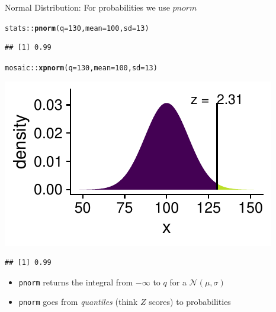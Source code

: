 \documentclass[10pt]{beamer}\usepackage[]{graphicx}\usepackage[]{color}
\makeatletter
\newcommand{\hlnum}[1]{\textcolor[rgb]{0.686,0.059,0.569}{#1}}%
\newcommand{\hlopt}[1]{\textcolor[rgb]{0,0,0}{#1}}%
\newcommand{\hlstd}[1]{\textcolor[rgb]{0.345,0.345,0.345}{#1}}%
\newcommand{\hlkwc}[1]{\textcolor[rgb]{0.333,0.667,0.333}{#1}}%
\newcommand{\hlkwd}[1]{\textcolor[rgb]{0.737,0.353,0.396}{\textbf{#1}}}%
\newenvironment{kframe}{%
 \def\at@end@of@kframe{}%
 \ifinner\ifhmode%
  \def\at@end@of@kframe{\end{minipage}}%
  \begin{minipage}{\columnwidth}%
 \fi\fi%
 \def\FrameCommand##1{\hskip\@totalleftmargin \hskip-\fboxsep
 \colorbox{shadecolor}{##1}\hskip-\fboxsep
     \hskip-\linewidth \hskip-\@totalleftmargin \hskip\columnwidth}%
 \MakeFramed {\advance\hsize-\width
   \@totalleftmargin\z@ \linewidth\hsize
   \@setminipage}}%
 {\par\unskip\endMakeFramed%
 \at@end@of@kframe}
\newenvironment{knitrout}{}{} %
\makeatother
\begin{document}
\begin{frame}[fragile]{Normal Distribution: For probabilities we use $pnorm$}
	
	
\begin{knitrout}\tiny
{}\color{fgcolor}\begin{kframe}
\begin{alltt}
\hlstd{stats}\hlopt{::}\hlkwd{pnorm}\hlstd{(}\hlkwc{q} \hlstd{=} \hlnum{130}\hlstd{,} \hlkwc{mean} \hlstd{=} \hlnum{100}\hlstd{,} \hlkwc{sd} \hlstd{=} \hlnum{13}\hlstd{)}
\end{alltt}
\begin{verbatim}
## [1] 0.99
\end{verbatim}
\end{kframe}
\end{knitrout}
	
	
\begin{knitrout}\tiny
{}\color{fgcolor}\begin{kframe}
\begin{alltt}
\hlstd{mosaic}\hlopt{::}\hlkwd{xpnorm}\hlstd{(}\hlkwc{q} \hlstd{=} \hlnum{130}\hlstd{,} \hlkwc{mean} \hlstd{=} \hlnum{100}\hlstd{,} \hlkwc{sd} \hlstd{=} \hlnum{13}\hlstd{)}
\end{alltt}
\end{kframe}

{\centering \includegraphics[width=0.6\linewidth]{figure/probs3-1} 

}


\begin{kframe}\begin{verbatim}
## [1] 0.99
\end{verbatim}
\end{kframe}
\end{knitrout}
	
	
	\begin{itemize}
		\item \texttt{pnorm} returns the integral from $-\infty$ to $q$ for a $\mathcal{N}(\mu, \sigma)$
		\item \texttt{pnorm} goes from \textit{quantiles} (think $Z$ scores) to probabilities
	\end{itemize}
	
\end{frame}
\end{document}
